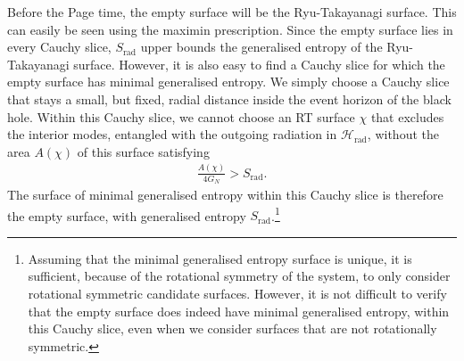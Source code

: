 \documentclass[12pt]{article}
\newcommand{\Srad}{S_\text{rad} }
\begin{document}
Before the Page time, the empty surface will be the Ryu-Takayanagi surface. This can easily be seen using the maximin prescription.  Since the empty surface lies in every Cauchy slice, $\Srad$ upper bounds the generalised entropy of the Ryu-Takayanagi surface. However, it is also easy to find a Cauchy slice for which the empty surface has minimal generalised entropy. We simply choose a Cauchy slice that stays a small, but fixed, radial distance inside the event horizon of the black hole. Within this Cauchy slice, we cannot choose an RT surface $\chi$ that excludes the interior modes, entangled with the outgoing radiation in $\mathcal{H}_\text{rad}$, without the area $A(\chi)$ of this surface satisfying
\begin{align}
\frac{A(\chi)}{4 G_N} > \Srad.
\end{align}
The surface of minimal generalised entropy within this Cauchy slice is therefore the empty surface, with generalised entropy $\Srad$.\footnote{Assuming that the minimal generalised entropy surface is unique, it is sufficient, because of the rotational symmetry of the system, to only consider rotational symmetric candidate surfaces. However, it is not difficult to verify that the empty surface does indeed have minimal generalised entropy, within this Cauchy slice, even when we consider surfaces that are not rotationally symmetric.}
\end{document}
